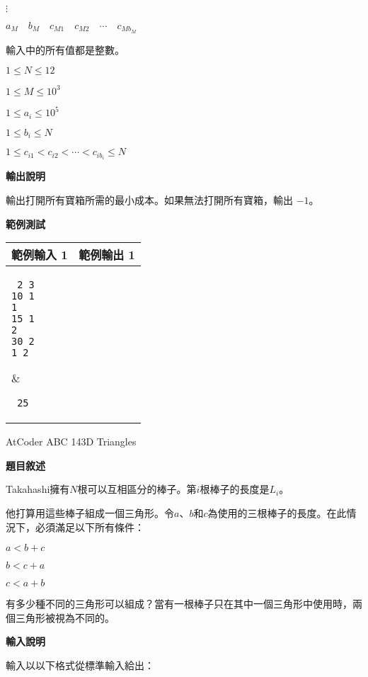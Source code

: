     $\vdots$
    
    $a_M \quad b_M \quad c_{M1} \quad c_{M2} \quad \cdots \quad c_{Mb_M}$

    輸入中的所有值都是整數。
    
    $1 \le N \le 12$
    
    $1 \le M \le 10^3$
    
    $1 \le a_i \le 10^5$
    
    $1 \le b_i \le N$
    
    $1 \le c_{i1} < c_{i2} < \cdots < c_{ib_i} \le N$

    \textbf{輸出說明}

    輸出打開所有寶箱所需的最小成本。如果無法打開所有寶箱，輸出 $-1$。

    \textbf{範例測試}

    \begin{tabular}{|m{7cm}|m{7cm}|}
        \hline
        範例輸入 1 & 範例輸出 1 \\
        \hline
        \parbox[t]{7cm} %
        { \tt
        2 3 \\
        10 1 \\
        1 \\
        15 1 \\
        2 \\
        30 2  \\
        1 2 \\
        } &
        \parbox[t]{7cm}
        { \tt
        25 \\
        } \\
        \hline
    \end{tabular}

    \problem AtCoder ABC 143D Triangles

    \textbf{題目敘述}

    Takahashi擁有$N$根可以互相區分的棒子。第$i$根棒子的長度是$L_i$。

    他打算用這些棒子組成一個三角形。令$a$、$b$和$c$為使用的三根棒子的長度。在此情況下，必須滿足以下所有條件：
    
    $a < b + c$
    
    $b < c + a$
    
    $c < a + b$
    
    有多少種不同的三角形可以組成？當有一根棒子只在其中一個三角形中使用時，兩個三角形被視為不同的。

    \textbf{輸入說明}

    輸入以以下格式從標準輸入給出：

